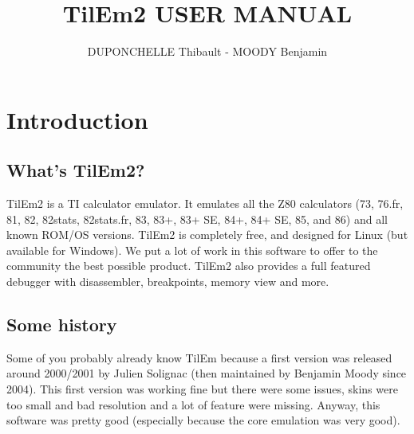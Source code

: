\documentclass[10pt]{report}
\title {TilEm2 USER MANUAL}
\author {DUPONCHELLE Thibault - MOODY Benjamin}
\begin{document}
\maketitle

\tableofcontents

\chapter{Introduction}
\section{What's TilEm2?}
TilEm2 is a TI calculator emulator. It emulates all the Z80 calculators (73, 76.fr, 81, 82, 82stats, 82stats.fr, 83, 83+, 83+ SE, 84+, 84+ SE, 85, and 86) and all known ROM/OS versions.\newline
TilEm2 is completely free, and designed for Linux (but available for Windows).\newline
We put a lot of work in this software to offer to the community the best possible product.\newline
TilEm2 also provides a full featured debugger with disassembler, breakpoints, memory view and more.\newline


\section{Some history}
Some of you probably already know TilEm because a first version was released around 2000/2001 by Julien Solignac (then maintained by Benjamin Moody since 2004).\newline
This first version was working fine but there were some issues, skins were too small and bad resolution and a lot of feature were missing.\newline
Anyway, this software was pretty good (especially because the core emulation was very good).\newline
\end{document}

